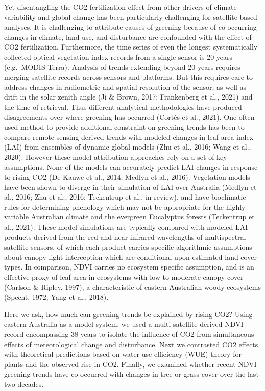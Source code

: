\documentclass[gc, manuscript]{copernicus}
\begin{document}
Yet disentangling the CO2 fertilization effect from other drivers of
climate variability and global change has been particularly challenging
for satellite based analyses. It is challenging to attribute causes of
greening because of co-occurring changes in climate, land-use, and
disturbance are confounded with the effect of CO2 fertilization.
Furthermore, the time series of even the longest systematically
collected optical vegetation index records from a single sensor is 20
years (e.g.~MODIS Terra). Analysis of trends extending beyond 20 years
requires merging satellite records across sensors and platforms. But
this requires care to address changes in radiometric and spatial
resolution of the sensor, as well as drift in the solar zenith angle (Ji
\& Brown, 2017; Frankenberg et al., 2021) and the time of retrieval.
Thus different analytical methodologies have produced disagreements over
where greening has occurred (Cortés et al., 2021). One often-used method
to provide additional constraint on greening trends has been to compare
remote sensing derived trends with modeled changes in leaf area index
(LAI) from ensembles of dynamic global models (Zhu et al., 2016; Wang et
al., 2020). However these model attribution approaches rely on a set of
key assumptions. None of the models can accurately predict LAI changes
in response to rising CO2 (De Kauwe et al., 2014; Medlyn et al., 2016).
Vegetation models have been shown to diverge in their simulation of LAI
over Australia (Medlyn et al., 2016; Zhu et al., 2016; Teckentrup et
al., in review), and have bioclimatic rules for determining phenology
which may not be appropriate for the highly variable Australian climate
and the evergreen Eucalyptus forests (Teckentrup et al., 2021). These
model simulations are typically compared with modeled LAI products
derived from the red and near infrared wavelengths of multispectral
satellite sensors, of which each product carries specific algorithmic
assumptions about canopy-light interception which are conditional upon
estimated land cover types. In comparison, NDVI carries no ecosystem
specific assumption, and is an effective proxy of leaf area in
ecosystems with low-to-moderate canopy cover (Carlson \& Ripley, 1997),
a characteristic of eastern Australian woody ecosystems (Specht, 1972;
Yang et al., 2018).

Here we ask, how much can greening trends be explained by rising CO2?
Using eastern Australia as a model system, we used a multi satellite
derived NDVI record encompassing 38 years to isolate the influence of
CO2 from simultaneous effects of meteorological change and disturbance.
Next we contrasted CO2 effects with theoretical predictions based on
water-use-efficiency (WUE) theory for plants and the observed rise in
CO2. Finally, we examined whether recent NDVI greening trends have
co-occurred with changes in tree or grass cover over the last two
decades.
\end{document}
